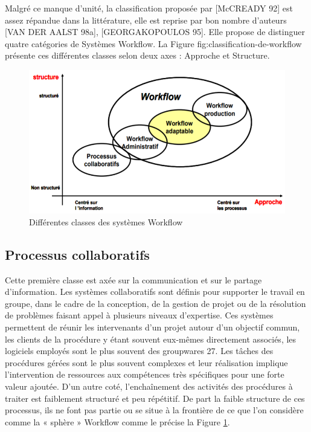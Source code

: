 Malgré ce manque d’unité, la classification proposée par [McCREADY 92] est assez répandue dans la littérature, elle est reprise par bon nombre d’auteurs [VAN DER AALST 98a],
[GEORGAKOPOULOS 95]. Elle propose de distinguer quatre catégories de Systèmes Workflow. La Figure fig:classification-de-workflow présente ces différentes classes selon deux axes : Approche et Structure.

\begin{figure}[h]
	\centering
	\includegraphics[width=0.7\linewidth]{"images/classification de workflow"}
	\caption{ Différentes classes des systèmes Workflow 
}
	\label{fig:classification-de-workflow}
\end{figure}


\subsection{Processus collaboratifs }
Cette première classe est axée sur la communication et sur le partage d’information. Les systèmes collaboratifs sont définis pour supporter le travail en groupe, dans le cadre de la conception, de la gestion de projet ou de la résolution de problèmes faisant appel à plusieurs niveaux d’expertise. Ces systèmes permettent de réunir les intervenants d’un projet autour d’un objectif commun, les clients de la procédure y étant souvent eux-mêmes directement associés, les logiciels employés sont le plus souvent des groupwares
27. Les tâches des procédures gérées sont le plus souvent complexes et leur réalisation implique l’intervention de ressources aux compétences très spécifiques pour une forte valeur ajoutée. D’un autre coté, l’enchaînement des activités des procédures à traiter est faiblement structuré et peu répétitif.
De part la faible structure de ces processus, ils ne font pas partie ou se situe à la frontière de ce que l’on considère comme la « sphère » Workflow comme le précise la Figure \ref{fig:classification-de-workflow}. 

